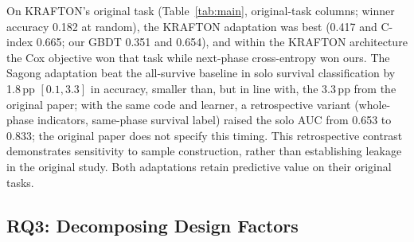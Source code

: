 \documentclass[sigconf,anonymous,nonacm]{acmart}
\begin{document}
On KRAFTON's original task (Table~\ref{tab:main}, original-task columns; winner accuracy 0.182 at random), the KRAFTON adaptation was best (0.417 and C-index 0.665; our GBDT 0.351 and 0.654), and within the KRAFTON architecture the Cox objective won that task while next-phase cross-entropy won ours.
The Sagong adaptation beat the all-survive baseline in solo survival classification by 1.8\,pp $[0.1, 3.3]$ in accuracy, smaller than, but in line with, the 3.3\,pp from the original paper; with the same code and learner, a retrospective variant (whole-phase indicators, same-phase survival label) raised the solo AUC from 0.653 to 0.833; the original paper does not specify this timing.
This retrospective contrast demonstrates sensitivity to sample construction, rather than establishing leakage in the original study. Both adaptations retain predictive value on their original tasks.

\subsection{RQ3: Decomposing Design Factors}
\label{sec:results:rq3}
\end{document}
